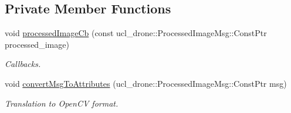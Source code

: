 \subsection*{Private Member Functions}
\begin{DoxyCompactItemize}
\item 
\mbox{\label{classVisionGui_a821250f86f11cd74cc1f1930589b5a46}} 
void \hyperlink{classVisionGui_a821250f86f11cd74cc1f1930589b5a46}{processed\+Image\+Cb} (const ucl\+\_\+drone\+::\+Processed\+Image\+Msg\+::\+Const\+Ptr processed\+\_\+image)
\begin{DoxyCompactList}\small\item\em Callbacks. \end{DoxyCompactList}\item 
\mbox{\label{classVisionGui_af7a9dfa6e4171669fc2540f92a0f9c31}} 
void \hyperlink{classVisionGui_af7a9dfa6e4171669fc2540f92a0f9c31}{convert\+Msg\+To\+Attributes} (ucl\+\_\+drone\+::\+Processed\+Image\+Msg\+::\+Const\+Ptr msg)
\begin{DoxyCompactList}\small\item\em Translation to Open\+CV format. \end{DoxyCompactList}\end{DoxyCompactItemize}
